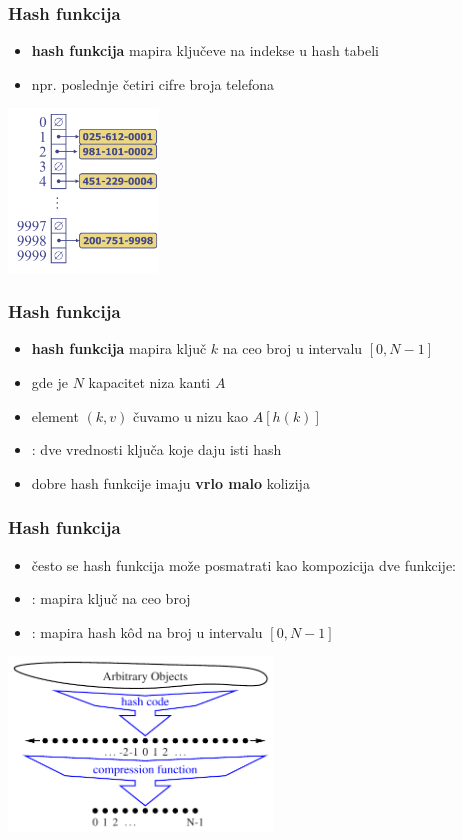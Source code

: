 \documentclass[compress,aspectratio=169]{beamer}
\begin{document}
\begin{frame}[fragile]
  \frametitle{Hash funkcija}
  \begin{itemize}
    \item \textbf{hash funkcija} mapira ključeve na indekse u hash tabeli  
    \item npr. poslednje četiri cifre broja telefona
  \end{itemize}
  \begin{center}
    \includegraphics[width=4cm]{asp-10-pic06.png}
  \end{center}
\end{frame}

\begin{frame}[fragile]
  \frametitle{Hash funkcija}
  \begin{itemize}
    \item \textbf{hash funkcija} mapira ključ $k$ na ceo broj u intervalu $[0,N-1]$
    \item gde je $N$ kapacitet niza kanti $A$
    \item element $(k,v)$ čuvamo u nizu kao $A[h(k)]$
    \item {}: dve vrednosti ključa koje daju isti hash
    \item dobre hash funkcije imaju \textbf{vrlo malo} kolizija
  \end{itemize}
\end{frame}

\begin{frame}[fragile]
  \frametitle{Hash funkcija}
  \begin{itemize}
    \item često se hash funkcija može posmatrati kao kompozicija dve funkcije:
    \item {}: mapira ključ na ceo broj
    \item {}: mapira hash kôd na broj u intervalu $[0,N-1]$ 
  \end{itemize}
  \begin{center}
    \includegraphics[width=7cm]{asp-10-pic07.pdf}
  \end{center}
\end{frame}
\end{document}
